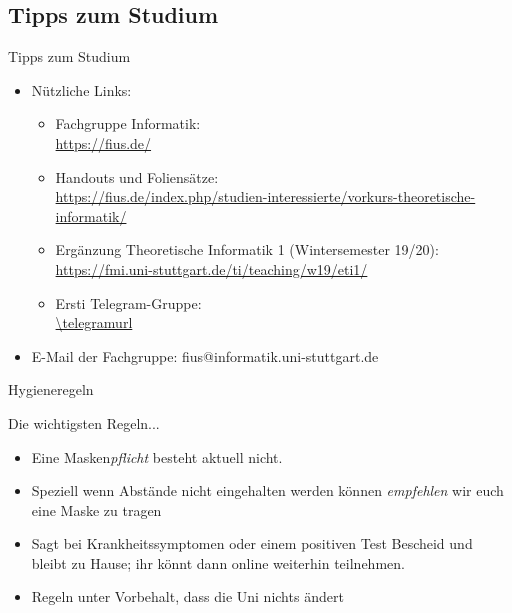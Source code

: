 \subsection{Tipps zum Studium}
\begin{frame}[fragile]{Tipps zum Studium}
    \begin{itemize}
        \item Nützliche Links:\\
            \begin{itemize}
                \item Fachgruppe Informatik:\\
                \url{https://fius.de/}
                \item Handouts und Foliensätze:\\ \url{https://fius.de/index.php/studien-interessierte/vorkurs-theoretische-informatik/}
                \item Ergänzung Theoretische Informatik 1 (Wintersemester 19/20): \\
                \url{https://fmi.uni-stuttgart.de/ti/teaching/w19/eti1/}
                \item Ersti Telegram-Gruppe:\\
                \qrcode[hyperlink]{\telegramurl}
                 \url{\telegramurl}
        	\end{itemize}
        \item E-Mail der Fachgruppe: fius@informatik.uni-stuttgart.de

    \end{itemize}
\end{frame}

\begin{frame}[fragile]{Hygieneregeln}
	\begin{alertblock}{Die wichtigsten Regeln...}
		\begin{itemize}
			\item Eine Masken\emph{pflicht} besteht aktuell nicht.
            \item Speziell wenn Abstände nicht eingehalten werden können \emph{empfehlen} wir euch eine Maske zu tragen
			\item Sagt bei Krankheitssymptomen oder einem positiven Test Bescheid und bleibt zu Hause; ihr könnt dann online weiterhin teilnehmen.
			\item Regeln unter Vorbehalt, dass die Uni nichts ändert
		\end{itemize}
	\end{alertblock}
\end{frame}

